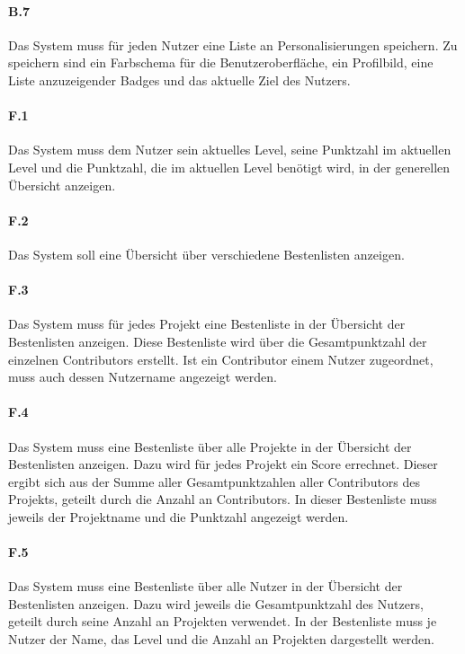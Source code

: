 \documentclass[
	oneside,  %
	ngerman, 
	final, 
	11pt, 
	a4paper, 
	1.1headlines, 
	headinclude=false, 
	footinclude=false, 
	mpinclude=false, 
	pagesize, 
	onecolumn, 
	titlepage, 
	parskip=half, 
	headsepline, 
	chapterprefix=false, 
	version=first, 
	listof=totoc, 
	bibliography=totoc, 
	toc=graduated, 
	fleqn
]{scrbook}
\begin{document}
\paragraph{B.7}
Das System muss für jeden Nutzer eine Liste an Personalisierungen speichern.
Zu speichern sind ein Farbschema für die Benutzeroberfläche, ein Profilbild, eine Liste anzuzeigender Badges und das aktuelle Ziel des Nutzers.

\paragraph{F.1}
Das System muss dem Nutzer sein aktuelles Level, seine Punktzahl im aktuellen Level und die Punktzahl, die im aktuellen Level benötigt wird, in der generellen Übersicht anzeigen.

\paragraph{F.2}
Das System soll eine Übersicht über verschiedene Bestenlisten anzeigen.

\paragraph{F.3}
Das System muss für jedes Projekt eine Bestenliste in der Übersicht der Bestenlisten anzeigen.
Diese Bestenliste wird über die Gesamtpunktzahl der einzelnen Contributors erstellt.
Ist ein Contributor einem Nutzer zugeordnet, muss auch dessen Nutzername angezeigt werden.

\paragraph{F.4}
Das System muss eine Bestenliste über alle Projekte in der Übersicht der Bestenlisten anzeigen.
Dazu wird für jedes Projekt ein Score errechnet.
Dieser ergibt sich aus der Summe aller Gesamtpunktzahlen aller Contributors des Projekts, geteilt durch die Anzahl an Contributors.
In dieser Bestenliste muss jeweils der Projektname und die Punktzahl angezeigt werden.

\paragraph{F.5}
Das System muss eine Bestenliste über alle Nutzer in der Übersicht der Bestenlisten anzeigen.
Dazu wird jeweils die Gesamtpunktzahl des Nutzers, geteilt durch seine Anzahl an Projekten verwendet.
In der Bestenliste muss je Nutzer der Name, das Level und die Anzahl an Projekten dargestellt werden.
\end{document}
